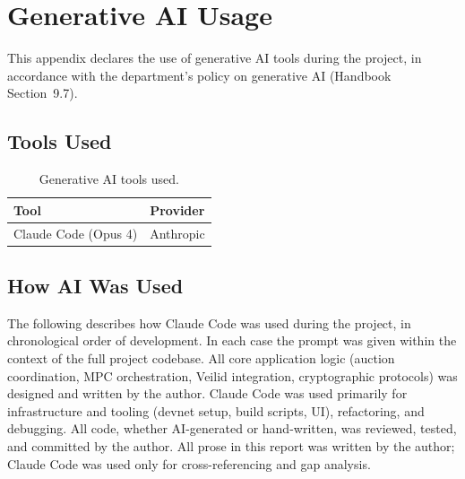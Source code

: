 \section{Generative AI Usage}
\label{app:ai}

This appendix declares the use of generative AI tools during the project,
in accordance with the department's policy on generative AI (Handbook
Section~9.7).

\subsection*{Tools Used}

\begin{table}[H]
\centering
\small
\renewcommand{\arraystretch}{1.3}
\begin{tabular}{|l|l|}
\hline
\textbf{Tool} & \textbf{Provider} \\
\hline
Claude Code (Opus 4) & Anthropic \\
\hline
\end{tabular}
\caption{Generative AI tools used.}
\end{table}

\subsection*{How AI Was Used}

The following describes how Claude Code was used during the project, in
chronological order of development.  In each case the prompt was given
within the context of the full project codebase.  All core application logic (auction coordination, MPC orchestration,
Veilid integration, cryptographic protocols) was designed and written by
the author.  Claude Code was used primarily for infrastructure and
tooling (devnet setup, build scripts, UI), refactoring, and debugging.
All code, whether AI-generated or hand-written, was reviewed, tested,
and committed by the author.  All prose in this report was written by
the author; Claude Code was used only for cross-referencing and gap
analysis.

